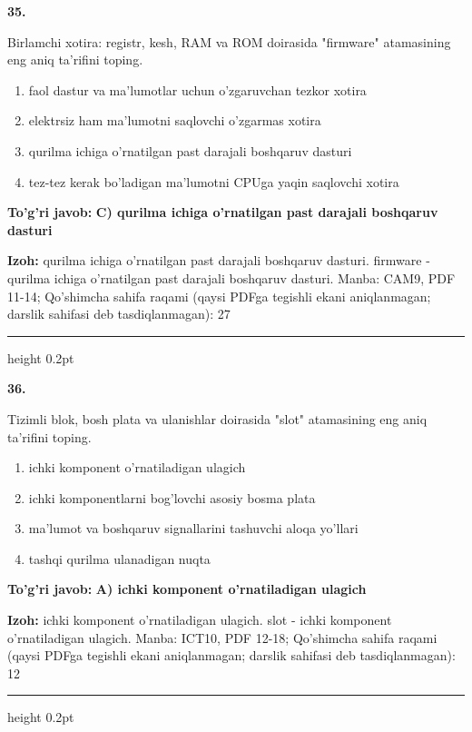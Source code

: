 \documentclass[10pt,a4paper]{article}
\begin{document}
{\bfseries\sffamily\color{ink} 35.}
\par
Birlamchi xotira: registr, kesh, RAM va ROM doirasida "firmware" atamasining eng aniq ta'rifini toping.
\begin{enumerate}[label=\Alph*),leftmargin=9mm]
\item faol dastur va ma'lumotlar uchun o'zgaruvchan tezkor xotira
\item elektrsiz ham ma'lumotni saqlovchi o'zgarmas xotira
\item qurilma ichiga o'rnatilgan past darajali boshqaruv dasturi
\item tez-tez kerak bo'ladigan ma'lumotni CPUga yaqin saqlovchi xotira
\end{enumerate}
\begin{tcolorbox}[enhanced,breakable,colback=teal!4,colframe=teal!60!black,boxrule=0.45pt,arc=1.2mm,left=2.7mm,right=2.7mm,top=1.8mm,bottom=1.8mm,before skip=2mm,after skip=2mm]
{\bfseries\sffamily\color{teal}To'g'ri javob:} \textbf{C) qurilma ichiga o'rnatilgan past darajali boshqaruv dasturi}
\par\smallskip
{\bfseries Izoh:} qurilma ichiga o'rnatilgan past darajali boshqaruv dasturi. firmware - qurilma ichiga o'rnatilgan past darajali boshqaruv dasturi. Manba: CAM9, PDF 11-14; Qo'shimcha sahifa raqami (qaysi PDFga tegishli ekani aniqlanmagan; darslik sahifasi deb tasdiqlanmagan): 27
\end{tcolorbox}
\vspace{2mm}\hrule height 0.2pt\vspace{3mm}

{\bfseries\sffamily\color{ink} 36.}
\par
Tizimli blok, bosh plata va ulanishlar doirasida "slot" atamasining eng aniq ta'rifini toping.
\begin{enumerate}[label=\Alph*),leftmargin=9mm]
\item ichki komponent o'rnatiladigan ulagich
\item ichki komponentlarni bog'lovchi asosiy bosma plata
\item ma'lumot va boshqaruv signallarini tashuvchi aloqa yo'llari
\item tashqi qurilma ulanadigan nuqta
\end{enumerate}
\begin{tcolorbox}[enhanced,breakable,colback=teal!4,colframe=teal!60!black,boxrule=0.45pt,arc=1.2mm,left=2.7mm,right=2.7mm,top=1.8mm,bottom=1.8mm,before skip=2mm,after skip=2mm]
{\bfseries\sffamily\color{teal}To'g'ri javob:} \textbf{A) ichki komponent o'rnatiladigan ulagich}
\par\smallskip
{\bfseries Izoh:} ichki komponent o'rnatiladigan ulagich. slot - ichki komponent o'rnatiladigan ulagich. Manba: ICT10, PDF 12-18; Qo'shimcha sahifa raqami (qaysi PDFga tegishli ekani aniqlanmagan; darslik sahifasi deb tasdiqlanmagan): 12
\end{tcolorbox}
\vspace{2mm}\hrule height 0.2pt\vspace{3mm}
\end{document}
